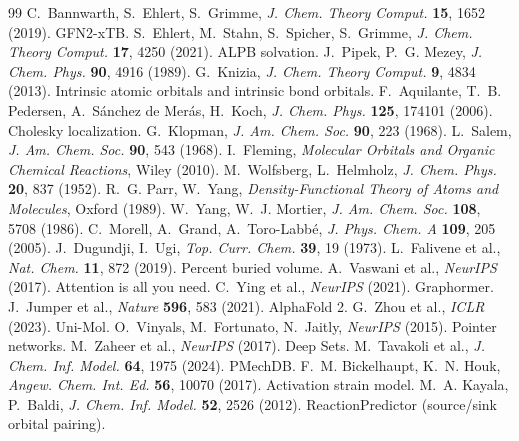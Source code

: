 \documentclass[11pt,a4paper]{article}
\begin{document}
\begin{thebibliography}{99}
 C.~Bannwarth, S.~Ehlert, S.~Grimme, \emph{J. Chem. Theory Comput.} \textbf{15}, 1652 (2019). GFN2-xTB.
 S.~Ehlert, M.~Stahn, S.~Spicher, S.~Grimme, \emph{J. Chem. Theory Comput.} \textbf{17}, 4250 (2021). ALPB solvation.
 J.~Pipek, P.~G. Mezey, \emph{J. Chem. Phys.} \textbf{90}, 4916 (1989).
 G.~Knizia, \emph{J. Chem. Theory Comput.} \textbf{9}, 4834 (2013). Intrinsic atomic orbitals and intrinsic bond orbitals.
 F.~Aquilante, T.~B. Pedersen, A.~S\'anchez de Mer\'as, H.~Koch, \emph{J. Chem. Phys.} \textbf{125}, 174101 (2006). Cholesky localization.
 G.~Klopman, \emph{J. Am. Chem. Soc.} \textbf{90}, 223 (1968).
 L.~Salem, \emph{J. Am. Chem. Soc.} \textbf{90}, 543 (1968).
 I.~Fleming, \emph{Molecular Orbitals and Organic Chemical Reactions}, Wiley (2010).
 M.~Wolfsberg, L.~Helmholz, \emph{J. Chem. Phys.} \textbf{20}, 837 (1952).
 R.~G. Parr, W.~Yang, \emph{Density-Functional Theory of Atoms and Molecules}, Oxford (1989).
 W.~Yang, W.~J. Mortier, \emph{J. Am. Chem. Soc.} \textbf{108}, 5708 (1986).
 C.~Morell, A.~Grand, A.~Toro-Labb\'e, \emph{J. Phys. Chem. A} \textbf{109}, 205 (2005).
 J.~Dugundji, I.~Ugi, \emph{Top. Curr. Chem.} \textbf{39}, 19 (1973).
 L.~Falivene et al., \emph{Nat. Chem.} \textbf{11}, 872 (2019). Percent buried volume.
 A.~Vaswani et al., \emph{NeurIPS} (2017). Attention is all you need.
 C.~Ying et al., \emph{NeurIPS} (2021). Graphormer.
 J.~Jumper et al., \emph{Nature} \textbf{596}, 583 (2021). AlphaFold 2.
 G.~Zhou et al., \emph{ICLR} (2023). Uni-Mol.
 O.~Vinyals, M.~Fortunato, N.~Jaitly, \emph{NeurIPS} (2015). Pointer networks.
 M.~Zaheer et al., \emph{NeurIPS} (2017). Deep Sets.
 M.~Tavakoli et al., \emph{J. Chem. Inf. Model.} \textbf{64}, 1975 (2024). PMechDB.
 F.~M. Bickelhaupt, K.~N. Houk, \emph{Angew. Chem. Int. Ed.} \textbf{56}, 10070 (2017). Activation strain model.
 M.~A. Kayala, P.~Baldi, \emph{J. Chem. Inf. Model.} \textbf{52}, 2526 (2012). ReactionPredictor (source/sink orbital pairing).
\end{thebibliography}
\end{document}
